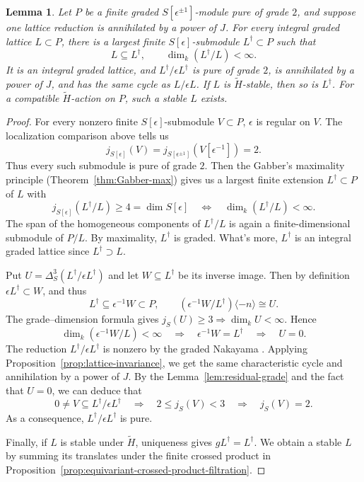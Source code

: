 \documentclass[11pt]{article}
\newtheorem{lemma}[theorem]{Lemma}
\theoremstyle{definition}
\begin{document}
\begin{lemma}\label{lem:pure-lattice}
Let $P$ be a finite graded $S[\epsilon^{\pm1}]$-module pure of
grade $2$, and suppose one lattice reduction is annihilated by
a power of $J$. For every integral graded lattice $L\subset P$,
there is a largest finite $S[\epsilon]$-submodule $L^\dagger\subset P$
such that
\[
 L\subseteq L^\dagger,\qquad \dim_k(L^\dagger/L)<\infty.
\]
It is an integral graded lattice, and $L^\dagger/\epsilon L^\dagger$
is pure of grade $2$, is annihilated by a power of $J$, and has the
same cycle as $L/\epsilon L$.
If $L$ is $\widetilde H$-stable, then so is $L^\dagger$.
For a compatible $\widetilde H$-action on $P$, such a stable $L$ exists.
\end{lemma}
\begin{proof}
For every nonzero finite $S[\epsilon]$-submodule $V\subset P$,
$\epsilon$ is regular on $V$. The localization comparison above tells us
\[
 j_{S[\epsilon]}(V)
 =j_{S[\epsilon^{\pm1}]}(V[\epsilon^{-1}])=2.
\]
Thus every such submodule is pure of grade $2$.
Then the Gabber's maximality principle (Theorem~\ref{thm:Gabber-max})
  gives us a largest finite extension $L^\dagger\subset P$ of $L$ with
\[
 j_{S[\epsilon]}(L^\dagger/L)\geq4=\dim S[\epsilon]
 \quad\Longleftrightarrow\quad \dim_k(L^\dagger/L)<\infty.
\]
The span of the homogeneous components of $L^\dagger/L$ is again
a finite-dimensional submodule of $P/L$. By maximality,
$L^\dagger$ is graded. What's more, $L^\dagger$ is an integral graded lattice since $L^\dagger\supset L$.

Put $U=\Delta_S^3(L^\dagger/\epsilon L^\dagger)$ and let
$W\subseteq L^\dagger$ be its inverse image. Then by definition $\epsilon L^\dagger\subset W$, and thus
\[
 L^\dagger\subseteq\epsilon^{-1}W\subset P,\qquad
 (\epsilon^{-1}W/L^\dagger)\langle-n\rangle\cong U.
\]
The grade--dimension formula gives $j_S(U)\ge3\Rightarrow\dim_k U<\infty$. Hence
\[
 \dim_k(\epsilon^{-1}W/L)<\infty
 \quad\Rightarrow\quad\epsilon^{-1}W=L^\dagger
 \quad\Rightarrow\quad U=0.
\]
The reduction $L^{\dagger}/\epsilon L^{\dagger}$ is nonzero by the graded Nakayama
\cite[Lemma~6.2]{NegronPevtsova2023}. Applying
Proposition~\ref{prop:lattice-invariance}, we get the same characteristic cycle
and annihilation by a power of $J$. By the Lemma~\ref{lem:residual-grade}
and the fact that $U=0$, we can deduce that
\[
 0\ne V\subseteq L^\dagger/\epsilon L^\dagger
 \quad\Rightarrow\quad 2\leq j_S(V)<3
 \quad\Rightarrow\quad j_S(V)=2.
\]As a consequence, $L^{\dagger}/\epsilon L^{\dagger}$ is pure. 

Finally, if $L$ is stable under $\widetilde{H}$, uniqueness gives $gL^\dagger=L^\dagger$.
We obtain a stable $L$ by summing its translates under the finite
crossed product in Proposition~\ref{prop:equivariant-crossed-product-filtration}.
\end{proof}
\end{document}
